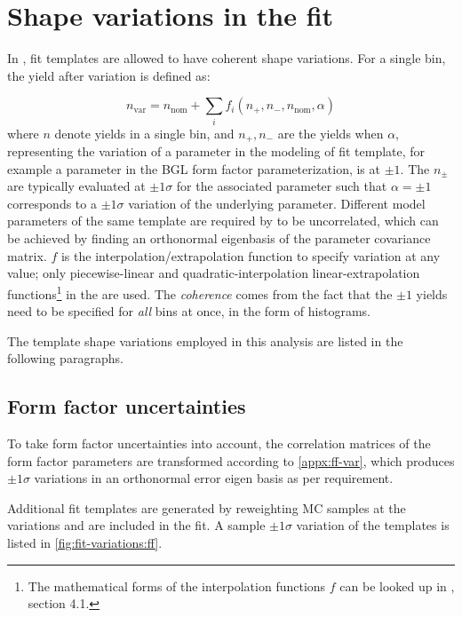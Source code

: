 \section{Shape variations in the fit}
\label{ref:fit:var}

In \HistFactory, fit templates are allowed to have coherent shape variations.
For a single bin, the yield after variation is defined as:

\begin{equation}
    n_\text{var} = n_\text{nom} + \sum_i f_i(n_+, n_-, n_\text{nom}, \alpha)
\end{equation}
where $n$ denote yields in a single bin, and
$n_+, n_-$ are the yields when $\alpha$,
representing the variation of a parameter in the modeling of fit template,
for example a parameter in the BGL form factor parameterization,
is at $\pm 1$.
The $n_\pm$ are typically evaluated at $\pm 1 \sigma$ for the associated
parameter such that $\alpha = \pm 1$ corresponds to a $\pm 1 \sigma$ variation
of the underlying parameter.
Different model parameters of the same template are required by \HistFactory to
be uncorrelated,
which can be achieved by finding an orthonormal eigenbasis of the parameter
covariance matrix.
$f$ is the interpolation/extrapolation function to specify variation
at any value;
only piecewise-linear and quadratic-interpolation linear-extrapolation
functions\footnote{
    The mathematical forms of the interpolation functions $f$ can be looked
    up in \cite{Cranmer:2012sba}, section 4.1.
} in the \HistFactory are used.
The \emph{coherence} comes from the fact that the $\pm 1$ yields need to be
specified for \emph{all} bins at once, in the form of histograms.

The template shape variations employed in this analysis are listed in the
following paragraphs.


\subsection{Form factor uncertainties}

To take form factor uncertainties into account, the correlation
matrices of the form factor parameters are transformed
according to \cref{appx:ff-var}, which produces $\pm 1\sigma$ variations
in an orthonormal error eigen basis as per \HistFactory requirement.

Additional fit templates are generated by reweighting MC samples at the
variations and are included in the fit.
A sample $\pm 1\sigma$ variation of the \Dz\mun templates is listed in
\cref{fig:fit-variations:ff}.

